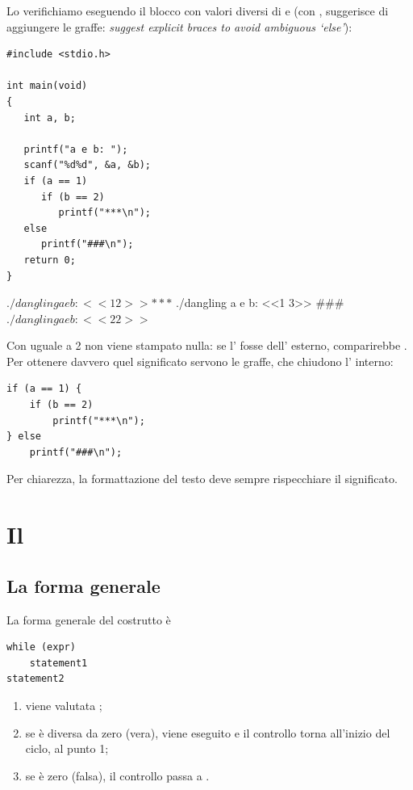 Lo verifichiamo eseguendo il blocco con valori diversi di  e
 (con ,  suggerisce di aggiungere le graffe:
\textit{suggest explicit braces to avoid ambiguous ‘else’}):

\begin{affianco}[0.5][c]
\begin{lstlisting}[style=c, name=dangling.c]
#include <stdio.h>

int main(void)
{
   int a, b;

   printf("a e b: ");
   scanf("%d%d", &a, &b);
   if (a == 1)
      if (b == 2)
         printf("***\n");
   else
      printf("###\n");
   return 0;
}
\end{lstlisting}
\risultato
\begin{console}
$ ./dangling
a e b: <<1 2>>
***
$ ./dangling
a e b: <<1 3>>
###
$ ./dangling
a e b: <<2 2>>
$
\end{console}
\end{affianco}

Con  uguale a 2 non viene stampato nulla: se l' fosse
dell' esterno, comparirebbe \code{\#\#\#}. Per ottenere davvero
quel significato servono le graffe, che chiudono l' interno:

\begin{lstlisting}[style=c]
if (a == 1) {
    if (b == 2)
        printf("***\n");
} else
    printf("###\n");
\end{lstlisting}

Per chiarezza, la formattazione del testo deve sempre rispecchiare il
significato.

\section{Il }

\subsection{La forma generale}

La forma generale del costrutto  è

\begin{affianco}[0.42][c]
\begin{lstlisting}[style=c]
while (expr)
    statement1
statement2
\end{lstlisting}
\risultato
\begin{enumerate}
  \item viene valutata ;
  \item se è diversa da zero (vera), viene eseguito  e il
        controllo torna all'inizio del ciclo, al punto 1;
  \item se è zero (falsa), il controllo passa a .
\end{enumerate}
\end{affianco}

